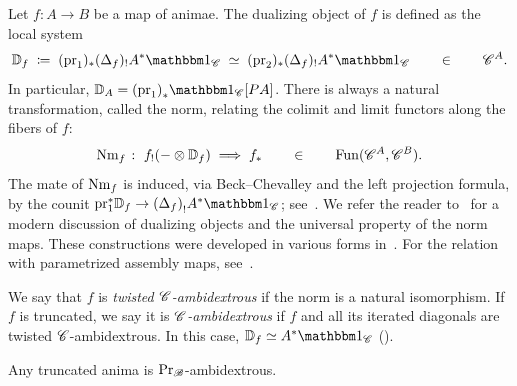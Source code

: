 \documentclass[english,svgnames,table]{article}
\begin{document}
    Let $f \colon A \to B$ be a map of animae. The dualizing object of $f$ is defined as the local system
    \begin{equation*}
        \DD_f \;\coloneq\; (\pr_1)_* (\Delta_f)_! A^* \ounit_{\cC} \;\simeq\; (\pr_2)_* (\Delta_f)_! A^* \ounit_{\cC} \qin \cC^A.
    \end{equation*}
    In particular, $\DD_A = {(\pr_1)}_* \ounit_{\cC}[\Path A]$.
    There is always a natural transformation, called the norm, relating the colimit and limit functors along the fibers of $f$:
    \begin{equation*}
        \operatorname{Nm}_f \;\colon\; f_!( - \otimes \mathbb{D}_f) \;\Longrightarrow\; f_* \qquad \in \qquad \operatorname{Fun}(\mathscr{C}^A, \mathscr{C}^B).
    \end{equation*}
    The mate of $\operatorname{Nm}_f$ is induced, via Beck--Chevalley and the left projection formula, by the counit $\pr_1^*\DD_f \to {(\Delta_f)}_!A^*\ounit_{\cC}$; see~\cite[Lemma~3.6]{Cnossen-2023-twisted-ambi}.
    We refer the reader to~\cite[Proposition~3.7]{Cnossen-2023-twisted-ambi} for a modern discussion of dualizing objects and the universal property of the norm maps. These constructions were developed in various forms in~\cite{Klein-2001-dualizing-object, Bauer-2004-pcompact, May-Sigurdsson-2006-parametrized, Rognes-2008-Galois, Hopkins-Lurie-2013-ambi, Costenoble-Waner-2016-equivariant, Nikolaus-Scholze-2018-TC, Balmer-DellAmbrogio-2020-Mackey}.
    For the relation with parametrized assembly maps, see~\cite{Quigley-Shah-2025-parametrized-Tate}.
    
    \begin{definition}
        We say that $f$ is \emph{twisted $\mathscr{C}$-ambidextrous} if the norm is a natural isomorphism.
        If $f$ is truncated, we say it is \emph{$\mathscr{C}$-ambidextrous} if $f$ and all its iterated diagonals are twisted $\mathscr{C}$-ambidextrous. In this case, $\DD_f \simeq A^*\ounit_{\cC}$ (\cite[Proposition~3.17]{Cnossen-2023-twisted-ambi}).
    \end{definition}

    \begin{example}
    \label{exm:ModB-ambi}
        Any truncated anima is $\operatorname{Pr}_{\mathscr{B}}$-ambidextrous.
    \end{example}
    
\end{document}
